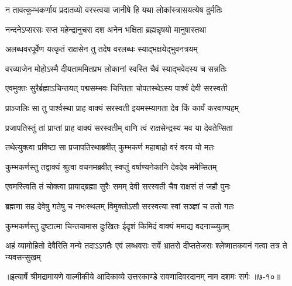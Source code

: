 \twolineshloka
{न तावत्कुम्भकर्णाय प्रदातव्यो वरस्त्वया}
{जानीषे हि यथा लोकांस्त्रासयत्येष दुर्मतिः} %

\twolineshloka
{नन्दनेऽप्सरसः सप्त महेन्द्रानुचरा दश}
{अनेन भक्षिता ब्रह्मन्नृषयो मानुषास्तथा} %

\twolineshloka
{अलब्धवरपूर्वेण यत्कृतं राक्षसेन तु}
{तदेष वरलब्धः स्याद्भक्षयेद्भुवनत्रयम्} %

\twolineshloka
{वरव्याजेन मोहोऽस्मै दीयताममितप्रभ}
{लोकानां स्वस्ति चैवं स्याद्भवेदस्य च सन्नतिः} %

\twolineshloka
{एवमुक्तः सुरैर्ब्रह्माऽचिन्तयत् पद्मसम्भवः}
{चिन्तिता चोपतस्थेऽस्य पार्श्वं देवी सरस्वती} %

\twolineshloka
{प्राञ्जलिः सा तु पार्श्वस्था प्राह वाक्यं सरस्वती}
{इयमस्म्यागता देव किं कार्यं करवाण्यहम्} %

\twolineshloka
{प्रजापतिस्तुं तां प्राप्तां प्राह वाक्यं सरस्वतीम्}
{वाणि त्वं राक्षसेन्द्रस्य भव या देवतेप्सिता} %

\twolineshloka
{तथेत्युक्त्वा प्रविष्टा सा प्रजापतिरथाब्रवीत्}
{कुम्भकर्ण महाबाहो वरं वरय यो मतः} %

\twolineshloka
{कुम्भकर्णस्तु तद्वाक्यं श्रुत्वा वचनमब्रवीत्}
{स्वप्तुं वर्षाण्यनेकानि देवदेव ममेप्सितम्} %

\twolineshloka
{एवमस्त्विति तं चोक्त्वा प्रायाद्ब्रह्मा सुरैः समम्}
{देवी सरस्वती चैव राक्षसं तं जहौ पुनः} %

\twolineshloka
{ब्रह्मणा सह देवेषु गतेषु च नभःस्थलम्}
{विमुक्तोऽसौ सरस्वत्या स्वां सञ्ज्ञां च ततो गतः} %

\twolineshloka
{कुम्भकर्णस्तु दुष्टात्मा चिन्तयामास दुःखितः}
{ईदृशं किमिदं वाक्यं ममाद्य वदनाच्च्युतम्} %

\threelineshloka
{अहं व्यामोहितो देवैरिति मन्ये तदाऽऽगतैः}
{एवं लब्धवराः सर्वे भ्रातरो दीप्ततेजसः}
{श्लेष्मातकवनं गत्वा तत्र ते न्यवसन्सुखम्} %


॥इत्यार्षे श्रीमद्रामायणे वाल्मीकीये आदिकाव्ये उत्तरकाण्डे रावणादिवरदानम् नाम दशमः सर्गः ॥७-१०॥
